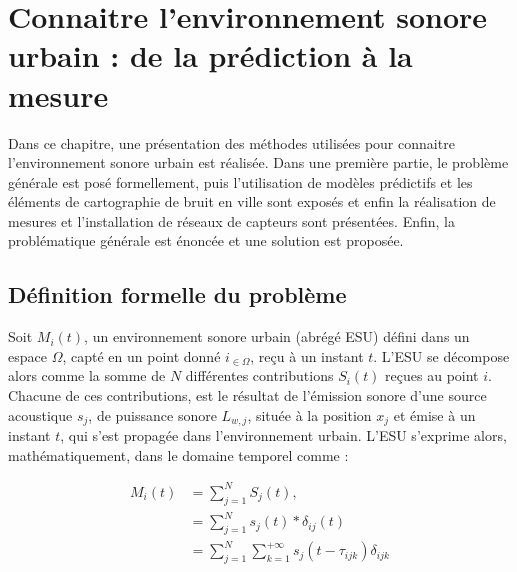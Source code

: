 
\chapter{Connaitre l'environnement sonore urbain : de la prédiction à la mesure}\label{chap:modele}
\thispagestyle{empty}

Dans ce chapitre, une présentation des méthodes utilisées pour connaitre l'environnement sonore urbain est réalisée. Dans une première partie, le problème générale est posé formellement, puis l'utilisation de modèles prédictifs et les éléments de cartographie de bruit en ville sont exposés et enfin la réalisation de mesures et l'installation de réseaux de capteurs sont présentées. Enfin, la problématique générale est énoncée et une solution est proposée.

\section{Définition formelle du problème}

Soit $M_{i}(t)$, un environnement sonore urbain (abrégé ESU) défini dans un espace $\Omega$, capté en un point donné $i_{\in \Omega}$, reçu à un instant $t$. L'ESU se décompose alors comme la somme de $N$ différentes contributions $S_i(t)$ reçues au point $i$. Chacune de ces contributions, est le résultat de l'émission sonore d'une source acoustique $s_j$, de puissance sonore $L_{w,j}$, située à la position $x_j$ et émise à un instant $t$,  qui s'est propagée dans l'environnement urbain. L'ESU s'exprime alors, mathématiquement, dans le domaine temporel comme : 

\begin{align}
M_i(t) &= \sum_{j = 1}^{N}S_j(t), \\
 & = \sum_{j = 1}^{N} s_j(t) \ast \delta_{ij}(t) \label{eq:convolution_ESU}\\
 & = \sum_{j = 1}^{N} \sum_{k = 1}^{+\infty} s_j(t-\tau_{ijk}) \delta_{ijk}\label{eq:propagation}
\end{align}

